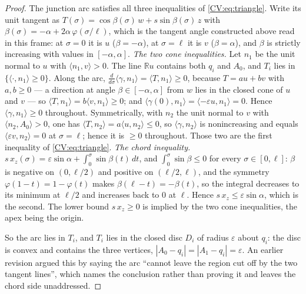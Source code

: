 \begin{proof}
The junction arc satisfies all three inequalities of \eqref{CV:eq:triangle}. Write
its unit tangent as $T(\sigma)=\cos\beta(\sigma)\,w+s\sin\beta(\sigma)\,z$ with
$\beta(\sigma)=-\alpha+2\alpha\,\varphi(\sigma/\ell)$, which is the tangent
angle constructed above read in this frame: at $\sigma=0$ it is $u$
($\beta=-\alpha$), at $\sigma=\ell$ it is $v$ ($\beta=\alpha$), and $\beta$ is
strictly increasing with values in $[-\alpha,\alpha]$.
\emph{The two cone inequalities.} Let $n_1$ be the unit normal to $u$ with
$\langle n_1,v\rangle>0$. The line $\mathbb Ru$ contains both $q_i$ and $A_0$,
and $T_i$ lies in $\{\langle\cdot,n_1\rangle\geq0\}$. Along the arc,
$\tfrac{d}{d\sigma}\langle\gamma,n_1\rangle=\langle T,n_1\rangle\geq0$, because
$T=au+bv$ with $a,b\geq0$ --- a direction at angle $\beta\in[-\alpha,\alpha]$
from $w$ lies in the closed cone of $u$ and $v$ --- so
$\langle T,n_1\rangle=b\langle v,n_1\rangle\geq0$; and
$\langle\gamma(0),n_1\rangle=\langle-\varepsilon u,n_1\rangle=0$. Hence
$\langle\gamma,n_1\rangle\geq0$ throughout. Symmetrically, with $n_2$ the unit
normal to $v$ with $\langle n_2,A_0\rangle>0$, one has $\langle
T,n_2\rangle=a\langle u,n_2\rangle\leq0$, so $\langle\gamma,n_2\rangle$ is
nonincreasing and equals $\langle\varepsilon v,n_2\rangle=0$ at $\sigma=\ell$;
hence it is $\geq0$ throughout. Those two are the first inequality of
\eqref{CV:eq:triangle}.
\emph{The chord inequality.} $s\,x_z(\sigma)=\varepsilon\sin\alpha+\int_0^\sigma
\sin\beta(t)\,dt$, and $\int_0^\sigma\sin\beta\leq0$ for every
$\sigma\in[0,\ell]$: $\beta$ is negative on $(0,\ell/2)$ and positive on
$(\ell/2,\ell)$, and the symmetry $\varphi(1-t)=1-\varphi(t)$ makes
$\beta(\ell-t)=-\beta(t)$, so the integral decreases to its minimum at
$\ell/2$ and increases back to $0$ at $\ell$. Hence $s\,x_z\leq\varepsilon
\sin\alpha$, which is the second. The lower bound $s\,x_z\geq0$ is implied by
the two cone inequalities, the apex being the origin.

So the arc lies in $T_i$, and $T_i$ lies in the closed disc $D_i$ of radius
$\varepsilon$ about $q_i$: the disc is convex and contains the three vertices,
$|A_0-q_i|=|A_1-q_i|=\varepsilon$. An earlier revision argued this by saying the
arc ``cannot leave the region cut off by the two tangent lines'', which names
the conclusion rather than proving it and leaves the chord side unaddressed.


\end{proof}
